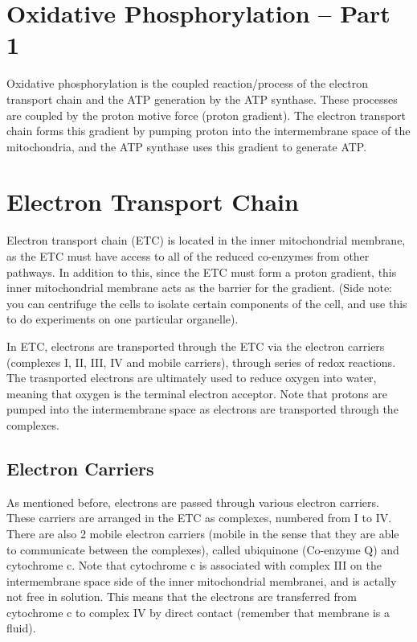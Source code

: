 \section{Oxidative Phosphorylation -- Part 1}

Oxidative phosphorylation is the coupled reaction/process of the electron transport chain and the ATP generation by the ATP synthase.
These processes are coupled by the proton motive force (proton gradient).
The electron transport chain forms this gradient by pumping proton into the intermembrane space of the mitochondria, and the ATP synthase uses this gradient to generate ATP.

\section{Electron Transport Chain}

Electron transport chain (ETC) is located in the inner mitochondrial membrane, as the ETC must have access to all of the reduced co-enzymes from other pathways.
In addition to this, since the ETC must form a proton gradient, this inner mitochondrial membrane acts as the barrier for the gradient.
(Side note: you can centrifuge the cells to isolate certain components of the cell, and use this to do experiments on one particular organelle).

\begin{center}
\end{center}

In ETC, electrons are transported through the ETC via the electron carriers (complexes I, II, III, IV and mobile carriers), through series of redox reactions.
The trasnported electrons are ultimately used to reduce oxygen into water, meaning that oxygen is the terminal electron acceptor.
Note that protons are pumped into the intermembrane space as electrons are transported through the complexes.

\subsection{Electron Carriers}

As mentioned before, electrons are passed through various electron carriers.
These carriers are arranged in the ETC as complexes, numbered from I to IV.
There are also 2 mobile electron carriers (mobile in the sense that they are able to communicate between the complexes), called ubiquinone (Co-enzyme Q) and cytochrome c.
Note that cytochrome c is associated with complex III on the intermembrane space side of the inner mitochondrial membranei, and is actally not free in solution.
This means that the electrons are transferred from cytochrome c to complex IV by direct contact (remember that membrane is a fluid).

